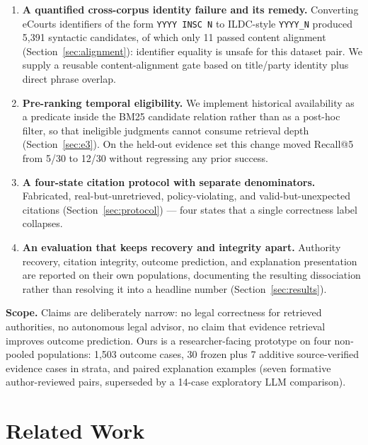 \documentclass[conference]{IEEEtran}
\begin{document}
\begin{enumerate}
\item \textbf{A quantified cross-corpus identity failure and its remedy.}
Converting eCourts identifiers of the form \texttt{YYYY INSC N} to ILDC-style
\texttt{YYYY\_N} produced 5{,}391 syntactic candidates, of which only 11 passed
content alignment (Section~\ref{sec:alignment}): identifier
equality is unsafe for this dataset pair. We supply a reusable
content-alignment gate based on title/party identity plus direct phrase overlap.

\item \textbf{Pre-ranking temporal eligibility.} We implement historical
availability as a predicate inside the BM25 candidate relation rather than as a
post-hoc filter, so that ineligible judgments cannot consume retrieval depth
(Section~\ref{sec:e3}). On the held-out evidence set this change moved
Recall@5 from 5/30 to 12/30 without regressing any prior success.

\item \textbf{A four-state citation protocol with separate denominators.}
Fabricated, real-but-unretrieved, policy-violating, and valid-but-unexpected
citations (Section~\ref{sec:protocol}) --- four states that a single
correctness label collapses.

\item \textbf{An evaluation that keeps recovery and integrity apart.} Authority
recovery, citation integrity, outcome prediction, and explanation
presentation are reported on their own populations, documenting the resulting
dissociation rather than resolving it into a headline number (Section~\ref{sec:results}).
\end{enumerate}

\textbf{Scope.} Claims are deliberately narrow: no legal
correctness for retrieved authorities, no autonomous legal advisor, no
claim that evidence retrieval improves outcome prediction. Ours is a
researcher-facing prototype on four non-pooled
populations: 1{,}503 outcome cases, 30 frozen plus 7 additive source-verified
evidence cases in strata, and paired explanation examples (seven
formative author-reviewed pairs, superseded by a 14-case exploratory LLM
comparison).

\section{Related Work}
\end{document}
